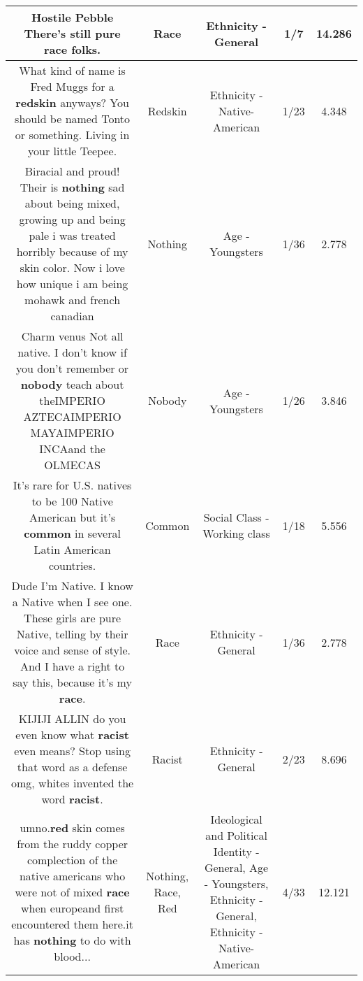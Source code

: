 \documentclass[11pt]{article}
\newlength\mylength
\begin{document}
\begin{center}
\begin{longtable}{|C{.65\mylength}|C{.30\mylength}|C{.12\mylength}|C{.12\mylength}|C{.12\mylength}|}
  \small Hostile Pebble  There's still pure \textbf{race} folks.\normalsize   & Race & Ethnicity - General & 1/7 & 14.286 \\  \hline
  \small What kind of name is Fred Muggs for a \textbf{redskin} anyways? You should be named Tonto or something. Living in your little Teepee.\normalsize   & Redskin & Ethnicity - Native-American & 1/23 & 4.348 \\  \hline
  \small Biracial and proud! Their is \textbf{nothing} sad about being mixed, growing up and being pale i was treated horribly because of my skin color. Now i love how unique i am being mohawk and french canadian\normalsize   & Nothing & Age - Youngsters & 1/36 & 2.778 \\  \hline
  \small Charm venus Not all native. I don't know if you don't remember or \textbf{nobody} teach about theIMPERIO AZTECAIMPERIO MAYAIMPERIO INCAand the OLMECAS\normalsize   & Nobody & Age - Youngsters & 1/26 & 3.846 \\  \hline
  \small It's rare for U.S. natives to be 100 Native American but it's \textbf{common} in several Latin American countries.\normalsize   & Common & Social Class - Working class & 1/18 & 5.556 \\  \hline
  \small Dude I'm Native. I know a Native when I see one. These girls are pure Native, telling by their voice and sense of style. And I have a right to say this, because it's my \textbf{race}.\normalsize   & Race & Ethnicity - General & 1/36 & 2.778 \\  \hline
  \small KIJIJI ALLIN do you even know what \textbf{racist} even means? Stop using that word as a defense omg, whites invented the word \textbf{racist}.\normalsize   & Racist & Ethnicity - General & 2/23 & 8.696 \\  \hline
  \small umno.\textbf{r\textbf{ed}} skin comes from the ruddy copper complection of the native americans who were not of mixed \textbf{race} when europeand first encountered them here.it has \textbf{nothing} to do with blood...\normalsize   & Nothing, Race, Red &  Ideological and Political Identity - General, Age - Youngsters, Ethnicity - General, Ethnicity - Native-American & 4/33 & 12.121 \\  \hline

\end{longtable}
\end{center}
\end{document}
